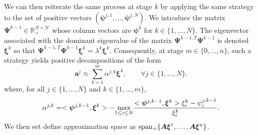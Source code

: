 \documentclass[12pt,a4paper]{article}
\newcommand{\calN}{\mathcal N}
\newcommand{\R}{\mathbb R}
\begin{document}
		We can then reiterate the same process at stage $k$ by applying the same strategy to the set of positive vectors 
$(\bm\psi^{j,1},\ldots,\bm\psi^{j,N})$.
We introduce the matrix $\bm\Psi^{k-1}\in\R_+^{N\times\calN}$ whose column vectors are $\bm\psi^k$ for $k\in\{1,\ldots,N\}$.
The eigenvector associated with the dominant eigenvalue of the matrix $\bm\Psi^{k-1,T}\bm\Psi^{k-1}$ is denoted $\bm\xi^k$ so that $\bm\Psi^{k-1,T}\bm\Psi^{k-1}\bm\xi^k = \lambda^k\bm\xi^k$.
Consequently, at stage $m\in\{0,\ldots,n\}$, such a strategy yields positive decompositions of the form
\begin{equation}\label{eq:stage_m_pos_dec}
		\bm a^j \approx \sum_{k=1}^m \alpha^{j,k}\bm \xi^k,\qquad \forall j\in\{1,\ldots,N\}.
\end{equation}
where, for all $j\in\{1,\ldots,N\}$ and $k\in \{1,\ldots, m\}$,
\begin{equation}
	\alpha^{j,k} = <\bm \psi^{j,k-1}, \bm \xi^k> - \underset{1\leq i\leq N}{\rm max}\frac{<\bm \psi^{j,k-1}, \bm \xi^k>\xi^k_i -  \psi^{j,k-1}_i}{\xi^k_i}.
\end{equation}
We then set define approximation space as ${\rm span_+}\{\bm A\bm\xi^1,\ldots,\bm A\bm\xi^n\}$.
\end{document}

